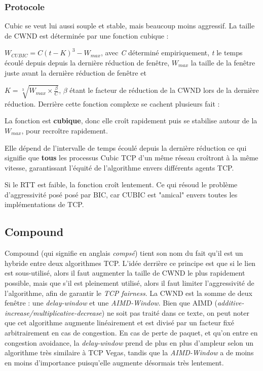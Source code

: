 \documentclass[	DIV=calc,%
							paper=a4,%
							fontsize=11pt,%
							twocolumn]{scrartcl}	 					%
\begin{document}
\subsubsection*{Protocole}
Cubic se veut lui aussi souple et stable, mais beaucoup moins aggressif. La taille de CWND est déterminée par une fonction cubique : 

$W_{CUBIC} = C(t-K)^3 - W_{max}$, avec \textit{C} déterminé empiriquement, \textit{t} le temps écoulé depuis depuis la dernière réduction de fenêtre, $W_{max}$ la taille de la fenêtre juste avant la dernière réduction de fenêtre et 

$K = \sqrt[3]{W_{max}\times\frac{\beta}{C}}$, $\beta$ étant le facteur de réduction de la CWND lors de la dernière réduction.
Derrière cette fonction complexe se cachent plusieurs fait :
\begin{description}
\item{La fonction est \textbf{cubique}, donc elle croît rapidement puis se stabilise autour de la $W_{max}$, pour recroître rapidement.}
\item{Elle dépend de l'intervalle de temps écoulé depuis la dernière réduction ce qui signifie que \textbf{tous} les processus Cubic TCP d'un même réseau croîtront à la même vitesse, garantissant l'équité de l'algorithme envers différents agents TCP.}
\item{Si le RTT est faible, la fonction croît lentement. Ce qui résoud le problème d'aggressivité posé posé par BIC, car CUBIC est "amical" envers toutes les implémentations de TCP.} 	
\end{description}

\subsection*{Compound}
Compound (qui signifie en anglais \textit{compsé}) tient son nom du fait qu'il est un hybride entre deux algorithmes TCP. L'idée derrière ce principe est que si le lien est sous-utilisé, alors il faut augmenter la taille de CWND le plus rapidement possible, mais que s'il est pleinement utilisé, alors il faut limiter l'aggressivité de l'algorithme, afin de garantir le \textit{TCP fairness}.
La CWND est la somme de deux fenêtre : une \textit{delay-window} et une \textit{AIMD-Window}. Bien que AIMD (\textit{additive-increase/multiplicative-decrease}) ne soit pas traité dans ce texte, on peut noter que cet algorithme augmente linéairement et est divisé par un facteur fixé arbitrairement en cas de congestion. En cas de perte de paquet, et qu'on entre en congestion avoidance, la \textit{delay-window} prend de plus en plus d'ampleur selon un algorithme très similaire à TCP Vegas, tandis que la \textit{AIMD-Window} a de moins en moins d'importance puisqu'elle augmente désormais très lentement.
\end{document}
